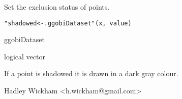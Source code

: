 \begin{Description}\relax
Set the exclusion status of points.
\end{Description}
\begin{Usage}
\begin{verbatim}"shadowed<-.ggobiDataset"(x, value)\end{verbatim}
\end{Usage}
\begin{Arguments}
\begin{ldescription}
\item[\code{x}] ggobiDataset
\item[\code{value}] logical vector
\end{ldescription}
\end{Arguments}
\begin{Details}\relax
If a point is shadowed it is drawn in a dark gray colour.
\end{Details}
\begin{Author}\relax
Hadley Wickham <h.wickham@gmail.com>
\end{Author}
\begin{SeeAlso}\relax
{}
\end{SeeAlso}
\begin{Examples}
\begin{ExampleCode}\end{ExampleCode}
\end{Examples}

